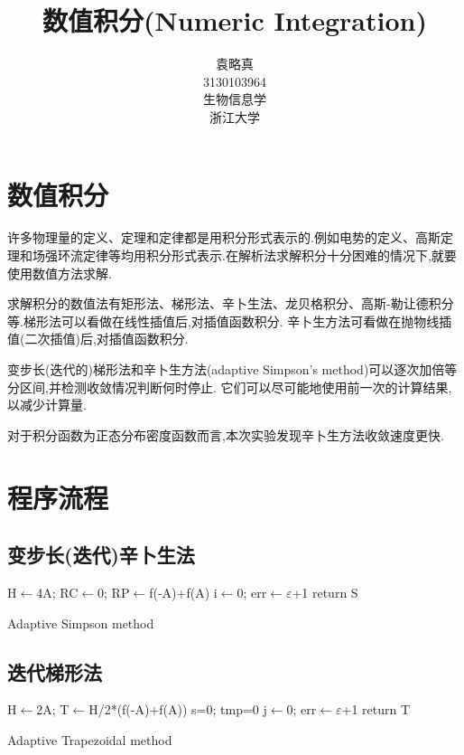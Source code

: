\documentclass[10pt,a4paper]{article}
\title{数值积分(Numeric Integration)}
\author{袁略真\\3130103964\\生物信息学\\浙江大学}
\begin{document}
\maketitle
\section{数值积分}
许多物理量的定义、定理和定律都是用积分形式表示的.例如电势的定义、高斯定理和场强环流定律等均用积分形式表示.在解析法求解积分十分困难的情况下,就要使用数值方法求解.

求解积分的数值法有矩形法、梯形法、辛卜生法、龙贝格积分、高斯-勒让德积分等.梯形法可以看做在线性插值后,对插值函数积分. 辛卜生方法可看做在抛物线插值(二次插值)后,对插值函数积分.

变步长(迭代的)梯形法和辛卜生方法(adaptive Simpson's method)可以逐次加倍等分区间,并检测收敛情况判断何时停止. 它们可以尽可能地使用前一次的计算结果,以减少计算量.

对于积分函数为正态分布密度函数而言,本次实验发现辛卜生方法收敛速度更快.

\section{程序流程}
\subsection{变步长(迭代)辛卜生法}
\begin{algorithm}[H]

H$\gets$4A; RC$\gets$0; RP$\gets$f(-A)+f(A)\;
i$\gets$0; err$\gets \varepsilon$+1\;
return S\;
 \caption{Adaptive Simpson method}
\end{algorithm}

\subsection{迭代梯形法}
\begin{algorithm}[H]

H$\gets$2A; T$\gets$H/2*(f(-A)+f(A))\;
s=0; tmp=0\;
j$\gets$0; err$\gets \varepsilon$+1\;
return T\;
 \caption{Adaptive Trapezoidal method}
\end{algorithm}
\end{document}
